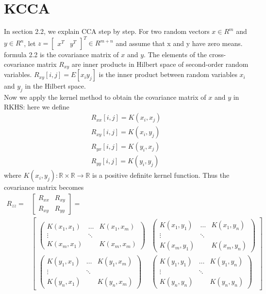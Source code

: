\documentclass[12pt]{report} %
\begin{document}
\section{KCCA}
In section 2.2, we explain CCA step by step. For two random vectors $x\in R^{m}$ and $y\in R^{n}$, let $z= \begin{bmatrix}x^T & y^T\end{bmatrix}^T \in R^{m+n}$ and assume that x and y have zero means. formula 2.2 is the covariance matrix of $x$ and $y$. The elements of the cross-covariance matrix $R_{xy}$ are inner products in Hilbert space of second-order random variables. $R_{xy}[i,j]=E[x_{i}y_{j}]$ is the inner product between random variables $x_{i}$ and $y_{j}$ in the Hilbert space. \\
Now we apply the kernel method to obtain the covariance matrix of $x$ and $y$ in RKHS: here we define
\begin{equation}
\begin{split}
R_{xx}[i,j] = K(x_{i},x_{j}) \\
R_{xy}[i,j] = K(x_{i},y_{j}) \\
R_{yx}[i,j] = K(y_{i},x_{j}) \\
R_{yy}[i,j] = K(y_{i},y_{j})
\end{split}
\end{equation}
where $K(x_{i},y_{j}): \mathbb{R} \times \mathbb{R} \to \mathbb{R}$ is a positive definite kernel function. Thus the covariance matrix becomes
\begin{equation}
\begin{split}
R_{zz}={} & \begin{bmatrix}
R_{xx} & R_{xy} \\
R_{xy} & R_{yy}
\end{bmatrix}= \\
& \begin{bmatrix}
\begin{pmatrix}
K(x_{1},x_{1}) & \dots & K(x_{1},x_{m})\\ \vdots & \ddots & \\ K(x_{m},x_{1}) & & K(x_{m},x_{m})
\end{pmatrix} &
\begin{pmatrix}
K(x_{1},y_{1}) & \dots & K(x_{1},y_{n})\\ \vdots & \ddots & \\ K(x_{m},y_{1}) & & K(x_{m},y_{n})
\end{pmatrix} \\
\begin{pmatrix}
K(y_{1},x_{1}) & \dots & K(y_{1},x_{m})\\ \vdots & \ddots & \\ K(y_{n},x_{1}) & & K(y_{n},x_{m})
\end{pmatrix} &
\begin{pmatrix}
K(y_{1},y_{1}) & \dots & K(y_{1},y_{n})\\ \vdots & \ddots & \\ K(y_{n},y_{n}) & & K(y_{n},y_{n})
\end{pmatrix}
\end{bmatrix}
\end{split}
\end{equation}
\end{document}
